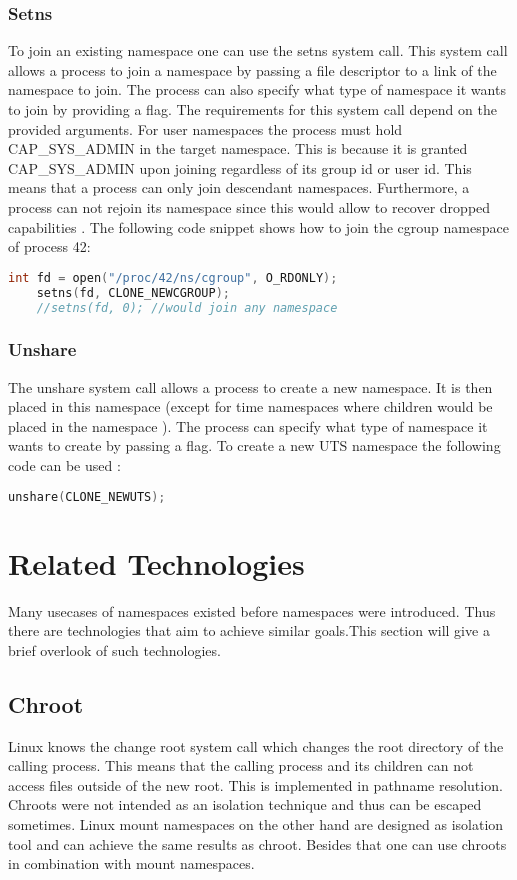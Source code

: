 \documentclass[10pt,twocolumn,a4paper]{article}
\begin{document}
\subsubsection{ Setns}
To join an existing namespace one can use the setns system call.
This system call allows a process to join a namespace by passing a file descriptor to a link of
the namespace to join. 
The process can also specify what type of namespace it wants to join by providing a flag. 
The requirements for this system call depend on the provided arguments. For user namespaces the process
must hold CAP\_SYS\_ADMIN in the target namespace. This is because  it is granted CAP\_SYS\_ADMIN upon joining
regardless of its group id or user id. This means that a process can only
join descendant namespaces. Furthermore, a process can not rejoin its namespace since this would allow to recover dropped capabilities \cite{23}. The following code snippet shows how to join the
cgroup namespace of process 42:
\begin{lstlisting}[language=C]
    int fd = open("/proc/42/ns/cgroup", O_RDONLY);
    setns(fd, CLONE_NEWCGROUP);
    //setns(fd, 0); //would join any namespace
\end{lstlisting}


\subsubsection{ Unshare}
The unshare system call allows a process to create a new namespace. It is then  placed in this
namespace (except for time namespaces where children would be placed in the namespace \cite{15}). 
The process can specify what type of namespace it wants to create by passing a flag. To create a new
UTS namespace the following code can be used \cite{24}:
\begin{lstlisting}[language=C]
    unshare(CLONE_NEWUTS);
\end{lstlisting}\section{Related Technologies}\label{sec:related}
Many usecases of namespaces existed before namespaces were introduced. Thus there are technologies
that aim to achieve similar goals.This section will give a brief overlook of such technologies.
\subsection{Chroot}
Linux knows the change root system call which changes the root directory of the calling
process. This means that the calling process and its children can not access files outside of the
new root. This is implemented in pathname resolution\cite{1}. Chroots were not intended as
an isolation technique and thus can be escaped sometimes. Linux mount namespaces on the other hand are designed as isolation tool and can achieve the same results as chroot. Besides that one can use
chroots in combination with mount namespaces\cite{1,25}. 
\end{document}
